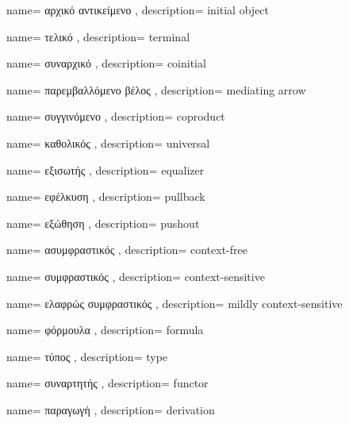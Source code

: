 {name={
αρχικό αντικείμενο
},
description={
initial object
}}

{name={
τελικό
},
description={
terminal
}}

{name={
συναρχικό
},
description={
coinitial
}}

{name={
παρεμβαλλόμενο βέλος
},
description={
mediating arrow
}}

{name={
συγγινόμενο
},
description={
coproduct
}}

{name={
καθολικός
},
description={
universal
}}

{name={
εξισωτής
},
description={
equalizer
}}

{name={
εφέλκυση
},
description={
pullback
}}

{name={
εξώθηση
},
description={
pushout
}}



{name={
ασυμφραστικός
},
description={
context-free
}}

{name={
συμφραστικός
},
description={
context-sensitive
}}

{name={
ελαφρώς συμφραστικός
},
description={
mildly context-sensitive
}}

{name={
φόρμουλα
},
description={
formula
}}

{name={
τύπος
},
description={
type
}}

{name={
συναρτητής
},
description={
functor
}}

{name={
παραγωγή
},
description={
derivation
}}

